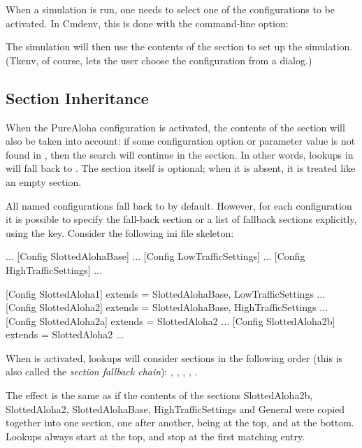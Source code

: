 When a simulation is run, one needs to select one of the configurations
to be activated. In Cmdenv, this is done with the  command-line option:


The simulation will then use the contents of the 
section to set up the simulation. (Tkenv, of course, lets the user choose
the configuration from a dialog.)


\subsection{Section Inheritance}
\label{sec:config-sim:section-inheritance}

When the PureAloha configuration is activated, the contents of
the \ttt{[General]} section will also be taken into account: if some
configuration option or parameter value is not found in ,
then the search will continue in the \ttt{[General]} section. In
other words, lookups in  will fall back to \ttt{[General]}.
The \ttt{[General]} section itself is optional; when it is absent, it is
treated like an empty \ttt{[General]} section.

All named configurations fall back to \ttt{[General]} by default. However, for
each configuration it is possible to specify the fall-back section or a list of
fallback sections explicitly, using the  key. Consider the
following ini file skeleton:

\begin{inifile}
[General]
...
[Config SlottedAlohaBase]
...
[Config LowTrafficSettings]
...
[Config HighTrafficSettings]
...

[Config SlottedAloha1]
extends = SlottedAlohaBase, LowTrafficSettings
...
[Config SlottedAloha2]
extends = SlottedAlohaBase, HighTrafficSettings
...
[Config SlottedAloha2a]
extends = SlottedAloha2
...
[Config SlottedAloha2b]
extends = SlottedAloha2
...
\end{inifile}


When  is activated, lookups will consider sections in the
following order (this is also called the \textit{section fallback chain}):
, , ,
, .

The effect is the same as if the contents of the sections
SlottedAloha2b, SlottedAloha2, SlottedAlohaBase, HighTrafficSettings and
General were copied together into one section, one after another,
 being at the top, and \ttt{[General]}
at the bottom. Lookups always start at the top, and stop at the first
matching entry.


